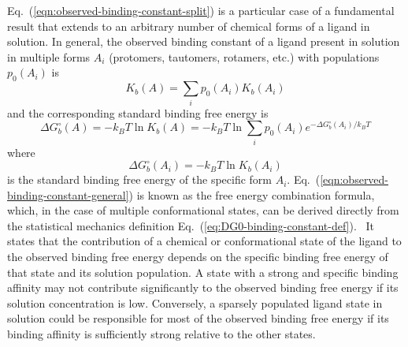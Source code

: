 \documentclass[9pt,bestpractices]{livecoms}
\begin{document}
Eq.~(\ref{eqn:observed-binding-constant-split}) is a particular case of a fundamental result that extends to an arbitrary number of chemical forms of a ligand in solution. In general, the observed binding constant of a ligand present in solution in multiple forms $A_i$ (protomers, tautomers, rotamers, etc.) with populations $p_0(A_i)$ is\cite{khuttan2023taming}
\begin{equation}
  K_b(A) = \sum_i p_0(A_i) K_b(A_i)
  \label{eqn:observed-binding-constant-general}
\end{equation}
and the corresponding standard binding free energy is
\begin{equation}
 \Delta G^\circ_b(A) = -k_B T \ln K_b(A) = -k_B T \ln \sum_i p_0(A_i) e^{-\Delta G^\circ_b(A_i)/k_B T}
  \label{eqn:observed-binding-free-energy-general}
\end{equation}
where
\begin{equation}
\Delta G^\circ_b(A_i) = -k_B T \ln K_b(A_i)
\end{equation}
is the standard binding free energy of the specific form $A_i$. Eq.~(\ref{eqn:observed-binding-constant-general}) is known as the free energy combination formula, which, in the case of multiple conformational states, can be derived directly from the statistical mechanics definition Eq.~(\ref{eq:DG0-binding-constant-def}).~\cite{jayachandran2006parallelized,gallicchio2011recent} It states that the contribution of a chemical or conformational state of the ligand to the observed binding free energy depends on the specific binding free energy of that state and its solution population. A state with a strong and specific binding affinity may not contribute significantly to the observed binding free energy if its solution concentration is low. Conversely, a sparsely populated ligand state in solution could be responsible for most of the observed binding free energy if its binding affinity is sufficiently strong relative to the other states.~\cite{azimi2022application}   
\end{document}

